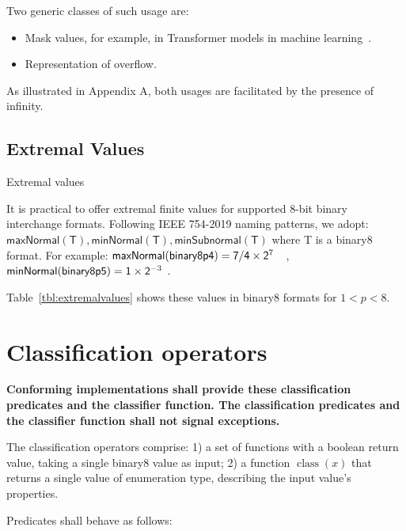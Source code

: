 \documentclass{article}
\def\val#1{$\mathsf{#1}$}
\def\binaryfloat#1#2{\ensuremath{#1 \times 2^{\mathrlap{#2}\phantom{-88}}}}
\newcommand{\spec}[1]{{\bf #1}}
\begin{document}
Two generic classes of such usage are: 
\begin{itemize}
\item Mask values, for example, in Transformer models in machine learning~\cite{torchtext:inf}.  
\item Representation of overflow.  
\end{itemize}
As illustrated in Appendix A, both usages are facilitated by the presence of infinity.

\clearpage
\subsection{Extremal Values}

\begin{table}[tbh]
\centering

\caption{Extremal values}
\label{tbl:extremalvalues}
\end{table}

It is practical to offer extremal finite values for supported 8-bit binary interchange formats.
Following IEEE 754-2019 naming patterns, we adopt:
\val{maxNormal(T), minNormal(T), minSubnormal(T)} where T is a binary8 format.
For example:
\val{maxNormal( binary8p4 ) = \binaryfloat{7/4}{7}}, 
\val{minNormal( binary8p5 ) = \binaryfloat{1}{-3}}.

Table~\ref{tbl:extremalvalues} shows these values in binary8 formats for $1<p<8$.

\clearpage
\section{Classification operators}
\spec{
Conforming implementations shall provide these classification predicates and the classifier function.
The classification predicates and the classifier function shall not signal exceptions.
}

\raggedright
The classification operators comprise: 1) a set of functions with a boolean return value, taking a single binary8 value as input; 2) a function $\operatorname{class}(x)$ that returns a single value of enumeration type, describing the input value's properties.

\raggedright
Predicates shall behave as follows:\\
\bigskip
\end{document}
